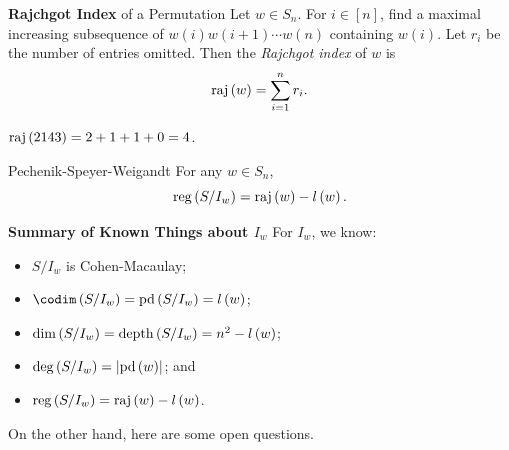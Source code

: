 \documentclass[co439]{subfiles}
\begin{document}
    \rruleline
    
    \begin{definition}{\textbf{Rajchgot Index} of a Permutation}
        Let $w\in S_n$. For $i\in\left[ n \right]$, find a maximal increasing subsequence of $w\left( i \right)w\left( i+1 \right)\cdots w\left( n \right)$ containing $w\left( i \right)$. Let $r_i$ be the number of entries omitted. Then the \emph{Rajchgot index} of $w$ is
        \begin{equation*}
            \operatorname{raj}\left( w \right) = \sum^{n}_{i=1}r_i.
        \end{equation*}
    \end{definition}

    \begin{example}{}
        $\operatorname{raj}\left( 2143 \right) = 2+1+1+0 = 4$.
    \end{example}

    \rruleline

    \begin{theorem}{Pechenik-Speyer-Weigandt}
        For any $w\in S_n$,
        \begin{equation*}
            \operatorname{reg}\left( S /I_w \right) = \operatorname{raj}\left( w \right)-l\left( w \right).
        \end{equation*}
    \end{theorem}
    
    \rruleline
    
    \begin{boxy}{\itckabelstd\textbf{Summary of Known Things about $I_w$}}
        For $I_w$, we know:
        \begin{itemize}
            \item $S /I_w$ is Cohen-Macaulay;
            \item $\codim\left( S /I_w \right) = \pd\left( S /I_w \right) = l\left( w \right)$;
            \item $\dim\left( S /I_w \right) = \operatorname{depth}\left( S /I_w \right) = n^{2}-l\left( w \right)$;
            \item $\deg\left( S /I_w \right) = \left| \operatorname{pd}\left( w \right) \right|$; and
            \item $\operatorname{reg}\left( S /I_w \right) = \operatorname{raj}\left( w \right)-l\left( w \right)$.
        \end{itemize} 
    \end{boxy}

    \np On the other hand, here are some open questions.
\end{document}
